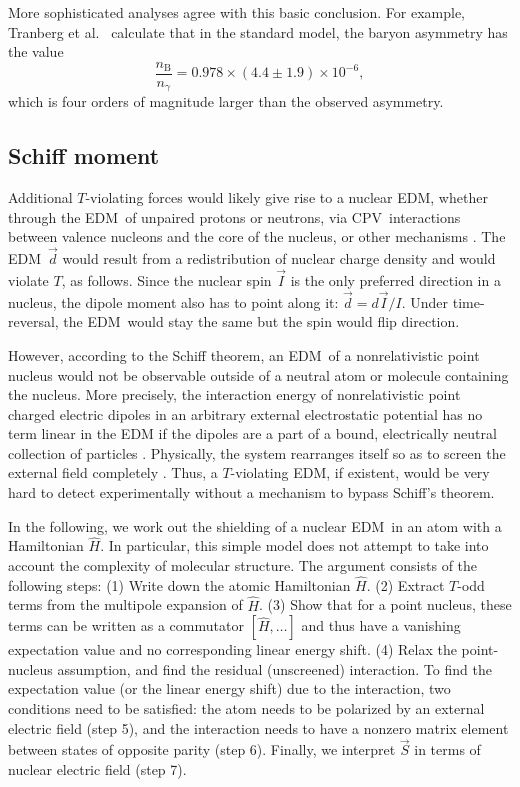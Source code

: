 More sophisticated analyses agree with this basic conclusion. For example,
Tranberg et al.\ \cite[eqn~20]{tranberg2010cold} calculate that in the standard
model, the baryon asymmetry has the value
%
\[
    \frac{n_\text{B}}{n_\gamma}=0.978\times(4.4\pm1.9)\times10^{-6},
\]
%
which is four orders of magnitude larger than the observed asymmetry.

\subsection{Schiff moment}

Additional $T$-violating forces would likely give rise to a nuclear \gls{EDM},
whether through the \gls{EDM}\ of unpaired protons or neutrons, via \gls{CPV}\
interactions between valence nucleons and the core of the nucleus, or other
mechanisms \cite{safronova2018search}. The \gls{EDM}\ $\vec d$ would result from
a redistribution of nuclear charge density and would violate $T$, as follows.
Since the nuclear spin $\vec I$ is the only preferred direction in a nucleus,
the dipole moment also has to point along it: $\vec d=d\vec I/I$. Under
time-reversal, the \gls{EDM}\ would stay the same but the spin would flip direction.

However, according to the Schiff theorem, an \gls{EDM}\ of a nonrelativistic
point nucleus would not be observable outside of a neutral atom or molecule
containing the nucleus. More precisely, the interaction energy of
nonrelativistic point charged electric dipoles in an arbitrary external
electrostatic potential has no term linear in the \gls{EDM} if the dipoles are a
part of a bound, electrically neutral collection of particles
\cite{schiff1963measurability}. Physically, the system rearranges itself so as
to screen the external field completely \cite[p33]{safronova2018search}. Thus, a
$T$-violating \gls{EDM}, if existent, would be very hard to detect
experimentally without a mechanism to bypass Schiff's theorem.

In the following, we work out the shielding of a nuclear \gls{EDM}\ in an atom
with a Hamiltonian $\hat H$. In particular, this simple model does not attempt
to take into account the complexity of molecular structure. The argument
consists of the following steps: (1) Write down the atomic Hamiltonian $\hat H$.
(2) Extract $T$-odd terms from the multipole expansion of $\hat H$. (3) Show
that for a point nucleus, these terms can be written as a commutator $[\hat
H,\ldots]$ and thus have a vanishing expectation value and no corresponding
linear energy shift. (4) Relax the point-nucleus assumption, and find the
residual (unscreened) interaction. To find the expectation value (or the linear
energy shift) due to the interaction, two conditions need to be satisfied: the
atom needs to be polarized by an external electric field (step 5), and the
interaction needs to have a nonzero matrix element between states of opposite
parity (step 6). Finally, we interpret $\vec S$ in terms of nuclear electric
field (step 7).

